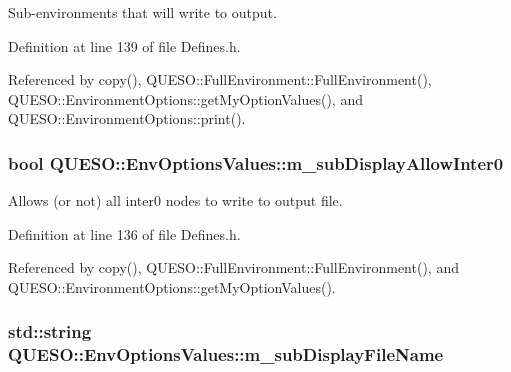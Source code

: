 Sub-\/environments that will write to output. 



Definition at line 139 of file Defines.\-h.



Referenced by copy(), Q\-U\-E\-S\-O\-::\-Full\-Environment\-::\-Full\-Environment(), Q\-U\-E\-S\-O\-::\-Environment\-Options\-::get\-My\-Option\-Values(), and Q\-U\-E\-S\-O\-::\-Environment\-Options\-::print().

\hypertarget{class_q_u_e_s_o_1_1_env_options_values_ae7b34ee974716034ae21a2c39891b8c3}{
\subsubsection[{m\-\_\-sub\-Display\-Allow\-Inter0}]{\setlength{\rightskip}{0pt plus 5cm}bool Q\-U\-E\-S\-O\-::\-Env\-Options\-Values\-::m\-\_\-sub\-Display\-Allow\-Inter0}}\label{class_q_u_e_s_o_1_1_env_options_values_ae7b34ee974716034ae21a2c39891b8c3}


Allows (or not) all inter0 nodes to write to output file. 



Definition at line 136 of file Defines.\-h.



Referenced by copy(), Q\-U\-E\-S\-O\-::\-Full\-Environment\-::\-Full\-Environment(), and Q\-U\-E\-S\-O\-::\-Environment\-Options\-::get\-My\-Option\-Values().

\hypertarget{class_q_u_e_s_o_1_1_env_options_values_ae92ff6d68751d90fd6fbb7de98e66ef2}{
\subsubsection[{m\-\_\-sub\-Display\-File\-Name}]{\setlength{\rightskip}{0pt plus 5cm}std\-::string Q\-U\-E\-S\-O\-::\-Env\-Options\-Values\-::m\-\_\-sub\-Display\-File\-Name}}\label{class_q_u_e_s_o_1_1_env_options_values_ae92ff6d68751d90fd6fbb7de98e66ef2}


